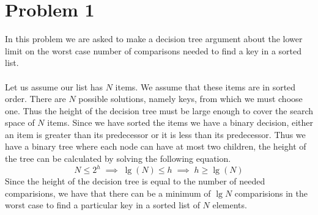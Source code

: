 \section*{Problem 1}

In this problem we are asked to make a decision tree argument about the
lower limit on the worst case number of comparisons needed to find a
key in a sorted list.
\\
\\
Let us assume our list has $N$ items. We assume that these items are in
sorted order. There are $N$ possible solutions, namely keys, from which 
we must choose one. Thus the height of the decision tree must be large
enough to cover the search space of $N$ items. Since we have sorted the 
items we have a binary decision, either an item is greater than its 
predecessor or it is less than its predecessor. Thus we have a binary 
tree where each node can have at most two children, the height of the 
tree can be calculated by solving the following equation.
$$
    N \leq 2^h \; \implies \; 
    \lg (N) \leq h \; \implies \; 
    h \geq \lg (N)
$$
Since the height of the decision tree is equal to the number of needed
comparisions, we have that there can be a minimum of $\lg N$
comparisions in the worst case to find a particular key in a sorted
list of $N$ elements.
